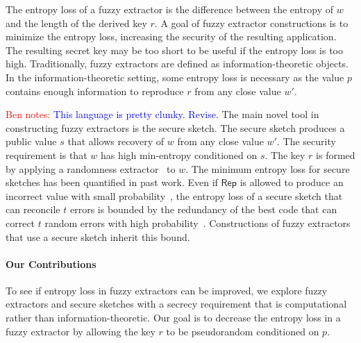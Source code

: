 \documentclass[11pt]{article}
\newcommand{\class}[1]{{\ensuremath{\mathsf{#1}}}}
\newcommand{\rep}{\ensuremath{\class{Rep}}\xspace}
\newcommand{\authnote}[2]{{\textcolor{red}{\textsf{#1 notes: }\textcolor{blue}{ #2}}\marginpar{\textcolor{red}{\textbf{!!!!!}}}}}
\newcommand{\authnote}[2]{}
\newcommand{\bnote}[1]{{\authnote{Ben}{#1}}}
\newcommand{\lnote}[1]{{\authnote{Leo}{#1}}}
\begin{document}
The entropy loss of a fuzzy extractor is the difference between the entropy of $w$ and the length of the derived key $r$.  A goal of fuzzy extractor constructions is to minimize the entropy loss, increasing the security of the resulting application.  The resulting secret key may be too short to be useful if the entropy loss is too high.  Traditionally, fuzzy extractors are defined as information-theoretic objects.  In the information-theoretic setting, some entropy loss is necessary as the value $p$ contains enough information to reproduce $r$ from any close value $w'$.  

\bnote{This language is pretty clunky. Revise.}
The main novel tool in constructing fuzzy extractors is the secure sketch.  The secure sketch produces a public value $s$ that allows recovery of $w$ from any close value $w'$.  The security requirement is that $w$ has high min-entropy conditioned on $s$.  The key $r$ is formed by applying a randomness extractor~\cite{nisan1993randomness} to $w$.
The minimum entropy loss for secure sketches has been quantified in past work.  Even if $\rep$ is allowed to produce an incorrect value with small probability~\cite[Section 8]{DBLP:journals/siamcomp/DodisORS08}, 
the entropy loss of a secure sketch that can reconcile $t$ errors
 is bounded by the redundancy of
the best code that can correct $t$ random errors with high probability~\cite[Proposition 8.2]{DBLP:journals/siamcomp/DodisORS08}.  Constructions of fuzzy extractors that use a secure sketch inherit this bound.

\paragraph {Our Contributions}
To see if entropy loss in fuzzy extractors can be improved, we explore fuzzy extractors and secure sketches with a secrecy requirement that is computational rather than information-theoretic.  Our goal is to decrease the entropy loss in a fuzzy extractor by allowing the key $r$ to be pseudorandom conditioned on $p$.  
\end{document}
